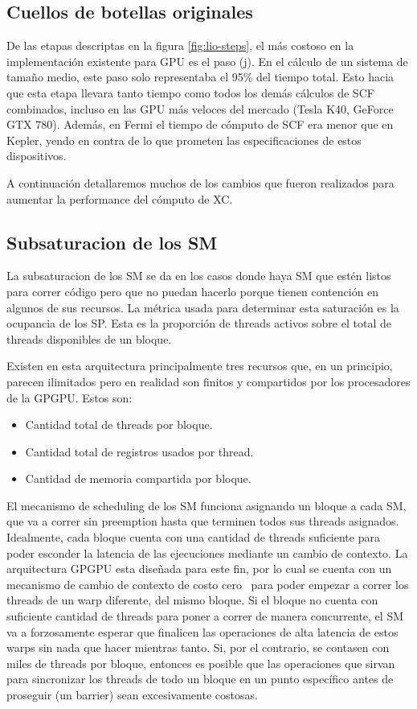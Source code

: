 \subsection{Cuellos de botellas originales}

De las etapas descriptas en la figura \ref{fig:lio-steps}, el m\'as costoso
en la implementaci\'on existente para GPU es el paso (j). En el c\'alculo de un sistema
de tama\~no medio, este paso solo representaba el 95\% del tiempo total. Esto hacia
que esta etapa llevara tanto tiempo como todos los dem\'as c\'alculos de SCF combinados, incluso
en las GPU m\'as veloces del mercado (Tesla K40, GeForce GTX 780). Adem\'as, en Fermi
el tiempo de c\'omputo de SCF era menor que en Kepler, yendo en contra de lo que prometen
las especificaciones de estos dispositivos.



A continuaci\'on detallaremos muchos de los cambios que fueron realizados para aumentar
la performance del c\'omputo de XC.

\subsection{Subsaturacion de los SM}
La subsaturacion de los SM se da en los casos donde haya SM que est\'en listos para correr
c\'odigo pero que no puedan hacerlo porque tienen contenci\'on en algunos de sus recursos.
La m\'etrica usada para determinar esta saturaci\'on es la ocupancia de los SP.
Esta es la proporci\'on de threads activos sobre el total de threads disponibles de un bloque.

Existen en esta arquitectura principalmente tres recursos que, en un principio, parecen
ilimitados pero en realidad son finitos y compartidos por los procesadores de la GPGPU.
Estos son:
\begin{itemize}
\item Cantidad total de threads por bloque.
\item Cantidad total de registros usados por thread.
\item Cantidad de memoria compartida por bloque.
\end{itemize}

El mecanismo de scheduling de los SM funciona asignando un bloque a cada SM, que
va a correr sin preemption hasta que terminen todos sus threads asignados. Idealmente, cada
bloque cuenta con una cantidad de threads suficiente para poder esconder la latencia
de las ejecuciones mediante un cambio de contexto. La arquitectura GPGPU esta dise\~nada
para este fin, por lo cual se cuenta con un mecanismo de cambio de contexto de costo cero~\cite{NvidiaFermi} para
poder empezar a correr los threads de un warp diferente, del mismo bloque.
Si el bloque no cuenta con suficiente cantidad de threads para poner a correr de manera
concurrente, el SM va a forzosamente esperar que finalicen las operaciones de alta latencia
de estos warps sin nada que hacer mientras tanto. Si, por el contrario, se contasen con
miles de threads por bloque, entonces es posible que las operaciones que sirvan
para sincronizar los threads de todo un bloque en un punto espec\'ifico antes de proseguir
(un barrier) sean excesivamente costosas.

